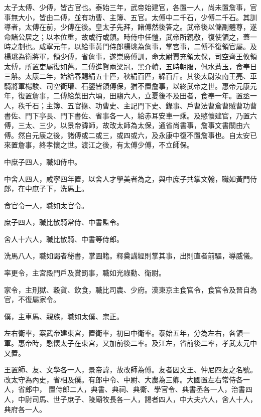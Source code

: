 \begin{pinyinscope}
 太子太傅、少傅，皆古官也。泰始三年，武帝始建官，各置一人，尚未置詹事，官事無大小，皆由二傅，並有功曹、主簿、五官。太傅中二千石，少傅二千石。其訓導者，太傅在前，少傅在後。皇太子先拜，諸傅然後答之。武帝後以儲副體尊，遂命諸公居之；以本位重，故或行或領。時侍中任愷，武帝所親敬，復使領之，蓋一時之制也。咸寧元年，以給事黃門侍郎楊珧為詹事，掌宮事，二傅不復領官屬。及楊珧為衛將軍，領少傅，省詹事，遂崇廣傅訓，命太尉賈充領太保，司空齊王攸領太傅，所置吏屬復如舊。二傅進賢兩梁冠，黑介幘，五時朝服，佩水蒼玉，食奉日
 三斛。太康二年，始給春賜絹五十匹，秋絹百匹，綿百斤。其後太尉汝南王亮、車騎將軍楊駿、司空衛瓘、石鑒皆領傅保，猶不置詹事，以終武帝之世。惠帝元康元年，復置詹事，二傅給菜田六頃，田騶六人，立夏後不及田者，食奉一年。置丞一人，秩千石；主簿、五官掾、功曹史、主記門下史、錄事、戶曹法曹倉曹賊曹功曹書佐、門下亭長、門下書佐、省事各一人，給赤耳安車一乘。及愍懷建官，乃置六傅，三太、三少，以景帝諱師，故改太師為太保，通省尚書事，詹事文書關由六傅。然自元康之後，諸傅或二或三，或四或六，及永康中復不置詹事也。自太安已
 來置詹事，終孝懷之世。渡江之後，有太傅少傅，不立師保。



 中庶子四人，職如侍中。



 中舍人四人，咸寧四年置，以舍人才學美者為之，與中庶子共掌文翰，職如黃門侍郎，在中庶子下，洗馬上。



 食官令一人，職如太官令。



 庶子四人，職比散騎常侍、中書監令。



 舍人十六人，職比散騎、中書等侍郎。



 洗馬八人，職如謁者秘書，掌圖籍。釋奠講經則掌其事，出則直者前驅，導威儀。



 率更令，主宮殿門戶及賞罰事，職如光祿勳、衛尉。



 家令，主刑獄、穀貨、飲食，職比司農、少府。漢東京主食官令，食官令及晉自為官，不復屬家令。



 僕，主車馬、親族，職如太僕、宗正。



 左右衛率，案武帝建東宮，置衛率，初曰中衛率。泰始五年，分為左右，各領一軍。惠帝時，愍懷太子在東宮，又加前後二率。及江左，省前後二率，孝武太元中又置。



 王置師、友、文學各一人，景帝諱，故改師為傅。友者因文王、仲尼四友之名號。改太守為內史，省相及僕。有郎中令、中尉、大農為三卿。大國置左右常侍各一人，省郎中，
 置侍郎二人，典書、典祠、典衛、學官令、典書丞各一人，治書四人，中尉司馬、世子庶子、陵廟牧長各一人，謁者四人，中大夫六人，舍人十人，典府各一人。




\end{pinyinscope}

